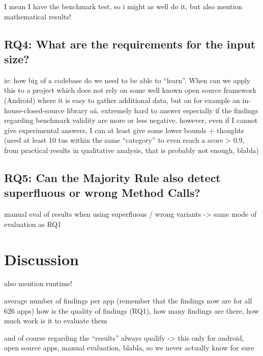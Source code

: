 
I mean I have the benchmark test, so i might as well do it, but also mention mathematical results!

\subsection{RQ4: What are the requirements for the input size?}

ie: how big of a codebase do we need to be able to ``learn''. When can we apply this to a project which does not rely on some well known open source framework (Android) where it is easy to gather additional data, but on for example an in-house-closed-source library oä.
extremely hard to answer especially if the findings regarding benchmark validity are more or less negative.
however, even if I cannot give experimental answers, I can at least give some lower bounds + thoughts
(need at least 10 tus within the same ``category'' to even reach a score > 0.9, from practical results in qualitative analysis, that is probably not enough, blabla)



\subsection{RQ5: Can the Majority Rule also detect superfluous or wrong Method Calls?}

manual eval of results when using superfluous / wrong variants
-> same mode of evaluation as RQ1

\section{Discussion}

also mention runtime!

average number of findings per app (remember that the findings now are for all 626 apps)
how is the quality of findings (RQ1), how many findings are there, how much work is it to evaluate them

and of course regarding the ``results'' always qualify -> this only for android, open source apps, manual evaluation, blabla, so we never actually know for sure

